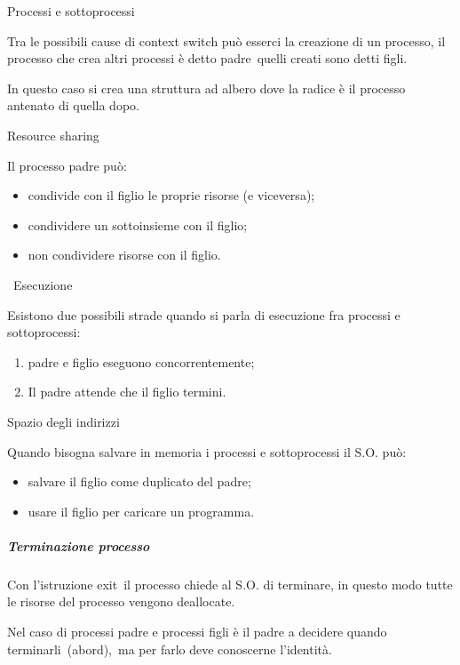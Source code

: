 \documentclass[
]{article}
\providecommand{\tightlist}{%
  \setlength{\itemsep}{0pt}\setlength{\parskip}{0pt}}
\begin{document}
{Processi e sottoprocessi}

{Tra le possibili cause di context switch può esserci la creazione di un
processo, il processo che crea altri processi è detto }{padre}{~quelli
creati sono detti }{figli}{.}

{In questo caso si crea una struttura ad albero dove la radice è il
processo antenato di quella dopo.}

{Resource sharing}

{Il processo padre può:}

\begin{itemize}
\tightlist
\item
  {condivide con il figlio le proprie risorse (e viceversa);}
\item
  {condividere un sottoinsieme con il figlio;}
\item
  {non condividere risorse con il figlio.}
\end{itemize}

{~}{Esecuzione}

{Esistono due possibili strade quando si parla di esecuzione fra
processi e sottoprocessi:}

\begin{enumerate}
\tightlist
\item
  {padre e figlio eseguono concorrentemente;}
\item
  {Il padre attende che il figlio termini.}
\end{enumerate}

{Spazio degli indirizzi }

{Quando bisogna salvare in memoria i processi e sottoprocessi il S.O.
può:}

\begin{itemize}
\tightlist
\item
  {salvare il figlio come duplicato del padre;}
\item
  {usare il figlio per caricare un programma.}
\end{itemize}

{}

\subparagraph{\texorpdfstring{{Terminazione
processo}}{Terminazione processo}}\label{h.qkwtrrzfxaut}

{Con l'istruzione }{exit}{~il processo chiede al S.O. di terminare, in
questo modo tutte le risorse del processo vengono deallocate.}

{}

{Nel caso di processi padre e processi figli è il padre a decidere
quando }{terminarli}{~(}{abord}{),}{~ma per farlo deve conoscerne
l'identità.}
\end{document}
